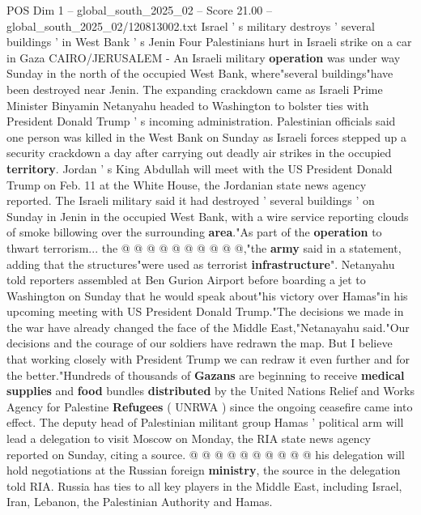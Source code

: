 \begin{textsample}{POS Dim 1 – global\_south\_2025\_02 – Score 21.00 – global\_south\_2025\_02/120813002.txt}  \label{ex:f1_pos_420}
Israel ' s military destroys ' several buildings ' in West Bank ' s Jenin Four Palestinians hurt in Israeli strike on a car in Gaza CAIRO/JERUSALEM - An Israeli military \textbf{operation} was under way Sunday in the north of the occupied West Bank, where"several buildings"have been destroyed near Jenin.
The expanding crackdown came as Israeli Prime Minister Binyamin Netanyahu headed to Washington to bolster ties with President Donald Trump ' s incoming administration.
Palestinian officials said one person was killed in the West Bank on Sunday as Israeli forces stepped up a security crackdown a day after carrying out deadly air strikes in the occupied \textbf{territory}.
Jordan ' s King Abdullah will meet with the US President Donald Trump on Feb. 11 at the White House, the Jordanian state news agency reported.
The Israeli military said it had destroyed ' several buildings ' on Sunday in Jenin in the occupied West Bank, with a wire service reporting clouds of smoke billowing over the surrounding \textbf{area}."As part of the \textbf{operation} to thwart terrorism... the @ @ @ @ @ @ @ @ @ @,"the \textbf{army} said in a statement, adding that the structures"were used as terrorist \textbf{infrastructure}".
Netanyahu told reporters assembled at Ben Gurion Airport before boarding a jet to Washington on Sunday that he would speak about"his victory over Hamas"in his upcoming meeting with US President Donald Trump."The decisions we made in the war have already changed the face of the Middle East,"Netanayahu said."Our decisions and the courage of our soldiers have redrawn the map.
But I believe that working closely with President Trump we can redraw it even further and for the better."Hundreds of thousands of \textbf{Gazans} are beginning to receive \textbf{medical} \textbf{supplies} and \textbf{food} bundles \textbf{distributed} by the United Nations Relief and Works Agency for Palestine \textbf{Refugees} ( UNRWA ) since the ongoing ceasefire came into effect.
The deputy head of Palestinian militant group Hamas ' political arm will lead a delegation to visit Moscow on Monday, the RIA state news agency reported on Sunday, citing a source. @ @ @ @ @ @ @ @ @ @ his delegation will hold negotiations at the Russian foreign \textbf{ministry}, the source in the delegation told RIA.
Russia has ties to all key players in the Middle East, including Israel, Iran, Lebanon, the Palestinian Authority and Hamas.

\end{textsample}
